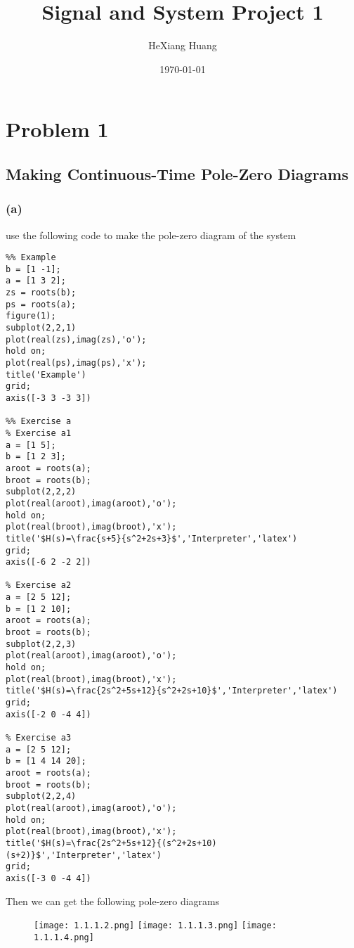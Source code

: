 \documentclass{article}
\begin{document}
\graphicspath{{F:/School/大二下/信号与系统/project/project 1/asset}}
\title{Signal and System Project 1}
\author{HeXiang Huang}
\date{\today}
\maketitle

\section{Problem 1}
\subsection{Making Continuous-Time Pole-Zero Diagrams}
\subsubsection*{(a)}
use the following code to make the pole-zero diagram of the system
\begin{lstlisting}
%% Example
b = [1 -1];
a = [1 3 2];
zs = roots(b);
ps = roots(a);
figure(1);
subplot(2,2,1)
plot(real(zs),imag(zs),'o');
hold on;
plot(real(ps),imag(ps),'x');
title('Example')
grid;
axis([-3 3 -3 3])

%% Exercise a
% Exercise a1
a = [1 5];
b = [1 2 3];
aroot = roots(a);
broot = roots(b);
subplot(2,2,2)
plot(real(aroot),imag(aroot),'o');
hold on;
plot(real(broot),imag(broot),'x');
title('$H(s)=\frac{s+5}{s^2+2s+3}$','Interpreter','latex')
grid;
axis([-6 2 -2 2])

% Exercise a2
a = [2 5 12];
b = [1 2 10];
aroot = roots(a);
broot = roots(b);
subplot(2,2,3)
plot(real(aroot),imag(aroot),'o');
hold on;
plot(real(broot),imag(broot),'x');
title('$H(s)=\frac{2s^2+5s+12}{s^2+2s+10}$','Interpreter','latex')
grid;
axis([-2 0 -4 4])

% Exercise a3
a = [2 5 12];
b = [1 4 14 20];
aroot = roots(a);
broot = roots(b);
subplot(2,2,4)
plot(real(aroot),imag(aroot),'o');
hold on;
plot(real(broot),imag(broot),'x');
title('$H(s)=\frac{2s^2+5s+12}{(s^2+2s+10)(s+2)}$','Interpreter','latex')
grid;
axis([-3 0 -4 4])
\end{lstlisting}
Then we can get the following pole-zero diagrams
\begin{figure}[h]
    \texttt{[image: 1.1.1.2.png]}
    \texttt{[image: 1.1.1.3.png]}
    \texttt{[image: 1.1.1.4.png]}
\end{figure}
\end{document}
